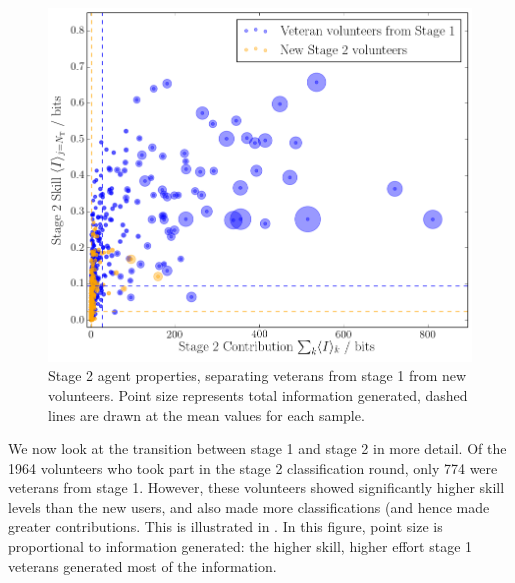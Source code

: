 \documentclass[useAMS,usenatbib,a4paper]{mn2e}
\begin{document}
\begin{figure}
\centering\includegraphics[width=0.9\linewidth]{sw-system-figs/stage2_veteran_contribution.png}
\caption{Stage 2 agent properties, separating veterans from stage 1 from new
volunteers. Point size represents total information generated, dashed lines
are drawn at the mean values for each sample.}
\label{fig:crowd:stage1vstage2}
\end{figure}

We now look at the transition between stage 1 and stage 2 in more detail. Of
the 1964 volunteers who took part in the stage 2 classification round, only
774 were veterans from stage 1. However, these volunteers showed significantly
higher skill levels than the new users, and also made more classifications
(and hence made greater contributions. This is illustrated in  
. In this figure, point size is proportional to
information generated: the higher skill, higher effort stage 1 veterans
generated most of the information.
\end{document}
